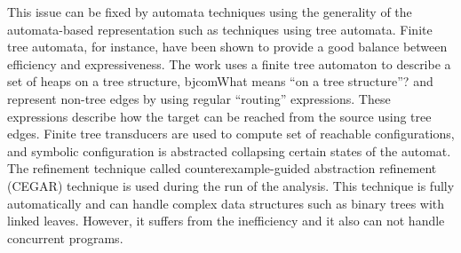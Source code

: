  
 This issue can be fixed  by automata  techniques using the generality of the automata-based representation such as techniques using tree automata. Finite tree automata, for instance, have been shown to provide a good balance between efficiency and expressiveness. The work \cite{Ahmed:TreeAutomata} uses a finite tree automaton to describe a set of heaps on a tree structure,
 bjcom{What means ``on a tree structure''?}
and represent non-tree edges by using regular “routing” expressions. These expressions
describe how the target can be reached from the source using tree edges.
Finite tree transducers
are used to compute set of reachable configurations, and symbolic configuration is abstracted
collapsing certain states of the automat. The refinement technique called counterexample-guided
abstraction refinement (CEGAR) technique is used during the run of the analysis. This technique
is fully automatically and can handle complex data structures such as binary trees with linked
leaves. However, it suffers from the inefficiency and it also can not handle concurrent programs.

